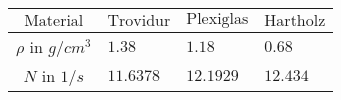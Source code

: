 \begin{tabular}{c|*{3}{*{1}{l}}}
$\text{Material}$ & $\text{Trovidur}$ & $\text{Plexiglas}$ & $\text{Hartholz}$ \\ \hline
$\rho$ in ${\si{g/cm^3}}$ & $1.38$ & $1.18$ & $0.68$ \\ \hline
$N$ in ${\si{1/s}}$ & $11.6378$ & $12.1929$ & $12.434$\end{tabular}
